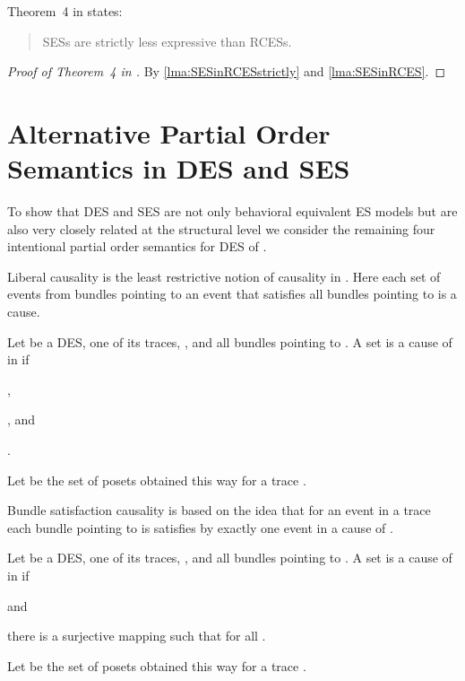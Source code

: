 \documentclass[runningheads,a4paper]{llncs}
\begin{document}
Theorem~4 in \cite{dynamicCausality15} states:
\begin{quote}
	SESs are strictly less expressive than RCESs.
\end{quote}

\begin{proof}[Proof of Theorem~4 in \cite{dynamicCausality15}]
	By \lems\ref{lma:SESinRCESstrictly} and \ref{lma:SESinRCES}.
\end{proof}

\section{Alternative Partial Order Semantics in DES and SES}
\label{app:partialOrderSemantics}

To show that DES and SES are not only behavioral equivalent ES models but are also very closely related at the structural level we consider the remaining four intentional partial order semantics for DES of \cite{Langerak97causalambiguity}.

Liberal causality is the least restrictive notion of causality in \cite{Langerak97causalambiguity}. Here each set of events from bundles pointing to an event  that satisfies all bundles pointing to  is a cause.

\begin{definition}
	Let  be a DES,  one of its traces, , and  all bundles pointing to .
	A set  is a cause of  in  if
	\begin{compactitem}
		\item ,
		\item , and
		\item .
	\end{compactitem}
	Let  be the set of posets obtained this way for a trace .
\end{definition}

Bundle satisfaction causality is based on the idea that for an event  in a trace each bundle pointing to  is satisfies by exactly one event in a cause of .

\begin{definition}
	Let  be a DES,  one of its traces, , and  all bundles pointing to .
	A set  is a cause of  in  if
	\begin{compactitem}
		\item  and
		\item there is a surjective mapping  such that  for all .
	\end{compactitem}
	Let  be the set of posets obtained this way for a trace .
\end{definition}
\end{document}
